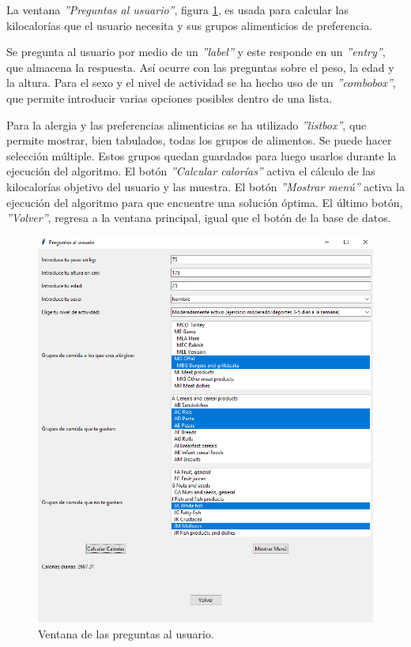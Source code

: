 La ventana \textit{''Preguntas al usuario''}, figura \ref{fig:ventana-usuario}, es usada para calcular las kilocalorías que el usuario necesita y sus grupos alimenticios de preferencia.

Se pregunta al usuario por medio de un \textit{''label''} y este responde en un \textit{''entry''}, que almacena la respuesta. Así ocurre con las preguntas sobre el peso, la edad y la altura. Para el sexo y el nivel de actividad se ha hecho uso de un \textit{''combobox''}, que permite introducir varias opciones posibles dentro de una lista.

Para la alergia y las preferencias alimenticias se ha utilizado \textit{''listbox''}, que permite mostrar, bien tabulados, todas los grupos de alimentos. Se puede hacer selección múltiple. Estos grupos quedan guardados para luego usarlos durante la ejecución del algoritmo.
\newpage
El botón \textit{''Calcular calorías''} activa el cálculo de las kilocalorías objetivo del usuario y las muestra. El botón \textit{''Mostrar menú''} activa la ejecución del algoritmo para que encuentre una solución óptima. El último botón, \textit{''Volver''}, regresa a la ventana principal, igual que el botón de la base de datos.

\begin{figure}[H]
    \centering
    \includegraphics[width=1\textwidth]{figures/ventana-preguntasusuario.png}
    \caption{Ventana de las preguntas al usuario.}
    \label{fig:ventana-usuario}
\end{figure}